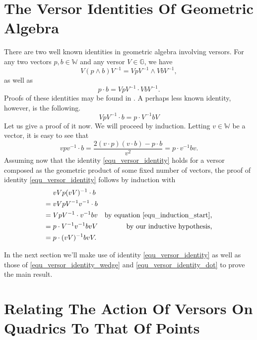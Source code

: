 \documentclass{birkjour}
\theoremstyle{definition}
\theoremstyle{remark}
\numberwithin{equation}{section}
\newcommand{\G}{\mathbb{G}}
\newcommand{\W}{\mathbb{W}}
\begin{document}
\section{The Versor Identities Of Geometric Algebra}

There are two well known identities in geometric algebra involving versors.
For any two vectors $p,b\in\W$ and any versor $V\in\G$, we have
\begin{equation}\label{equ_versor_identity_wedge}
V(p\wedge b)V^{-1} = VpV^{-1}\wedge VbV^{-1},
\end{equation}
as well as
\begin{equation}\label{equ_versor_identity_dot}
p\cdot b = VpV^{-1}\cdot VbV^{-1}.
\end{equation}
Proofs of these identities may be found in \cite{Parkin12_intro}.
A perhaps less known identity, however, is the following.
\begin{equation}\label{equ_versor_identity}
VpV^{-1}\cdot b = p\cdot V^{-1}bV
\end{equation}
Let us give a proof of it now.  We will proceed by induction.
Letting $v\in\W$ be a vector, it is easy to see that
\begin{equation}\label{equ_induction_start}
vpv^{-1}\cdot b = \frac{2(v\cdot p)(v\cdot b) - p\cdot b}{v^2} = p\cdot v^{-1}bv.
\end{equation}
Assuming now that the identity \eqref{equ_versor_identity} holds for a versor
composed as the geometric product of some fixed number of vectors, the proof of identity
\eqref{equ_versor_identity} follows by induction with
\begin{align}
& vVp(vV)^{-1}\cdot b \\
=\;& vVpV^{-1}v^{-1}\cdot b \\
=\;& VpV^{-1}\cdot v^{-1}bv & \mbox{by equation \eqref{equ_induction_start},} \\
=\;& p\cdot V^{-1}v^{-1}bvV & \mbox{by our inductive hypothesis,} \\
=\;& p\cdot (vV)^{-1}bvV.
\end{align}

In the next section we'll make use of identity \eqref{equ_versor_identity} as well as those of
\eqref{equ_versor_identity_wedge} and \eqref{equ_versor_identity_dot} to prove the main result.

\section{Relating The Action Of Versors On Quadrics To That Of Points}
\end{document}
